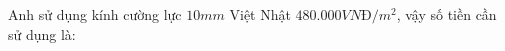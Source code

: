 \documentclass[preview]{standalone}
\begin{document}
\begin{center}
Anh sử dụng kính cường lực $10 mm$ Việt Nhật $480.000VNĐ/m^2$, vậy số tiền cần sử dụng là:
\end{center}
\end{document}
